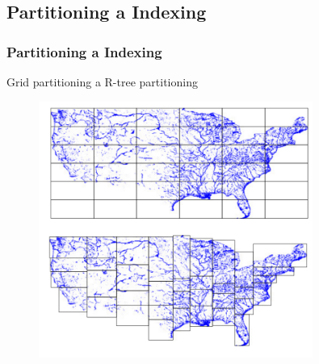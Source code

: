 \documentclass[unicode,bookmarksnumbered]{beamer}
\begin{document}
	\subsection{Partitioning a Indexing}
	\begin{frame}
	\frametitle{Partitioning a Indexing}
			Grid partitioning a R-tree partitioning 
			\begin{figure}
				\centering
				\includegraphics[width=0.8\textwidth]{./img/spatial/spatial_hadoop_parti.png}
			\end{figure}
	\end{frame}
%


%


%
\end{document}

